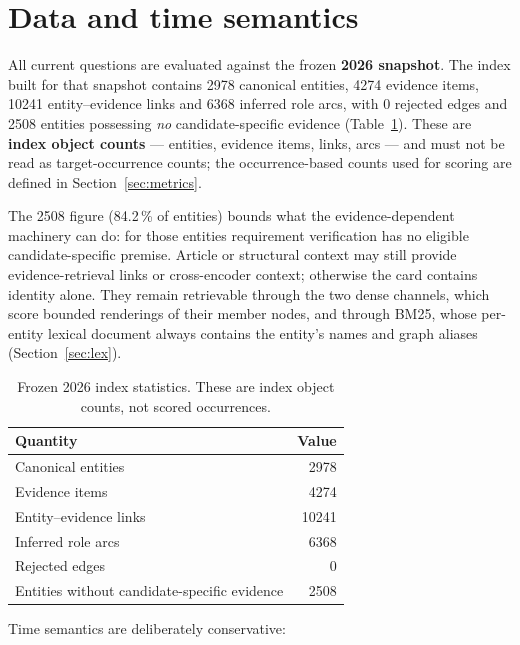 \documentclass[11pt,a4paper]{article}
\begin{document}
\section{Data and time semantics}

All current questions are evaluated against the frozen \textbf{2026 snapshot}. The index built for that
snapshot contains 2978 canonical entities, 4274 evidence items, 10241 entity--evidence links and 6368
inferred role arcs, with 0 rejected edges and 2508 entities possessing \emph{no} candidate-specific evidence
(Table~\ref{tab:index}). These are \textbf{index object counts} --- entities, evidence items, links, arcs
--- and must not be read as target-occurrence counts; the occurrence-based counts used for scoring are
defined in Section~\ref{sec:metrics}.

The 2508 figure (84.2\,\% of entities) bounds what the evidence-dependent machinery can do: for those
entities requirement verification has no eligible candidate-specific premise. Article or structural
context may still provide evidence-retrieval links or cross-encoder context; otherwise the card contains
identity alone. They remain retrievable through the two dense channels, which score bounded renderings of
their member nodes, and through BM25, whose per-entity lexical document always contains the entity's names
and graph aliases (Section~\ref{sec:lex}).

\begin{table}[htbp]
\centering
\caption{Frozen 2026 index statistics. These are index object counts, not scored occurrences.}
\label{tab:index}
\begin{tabular}{lr}
\toprule
Quantity & Value \\
\midrule
Canonical entities & 2978 \\
Evidence items & 4274 \\
Entity--evidence links & 10241 \\
Inferred role arcs & 6368 \\
Rejected edges & 0 \\
Entities without candidate-specific evidence & 2508 \\
\bottomrule
\end{tabular}
\end{table}

Time semantics are deliberately conservative:
\end{document}
